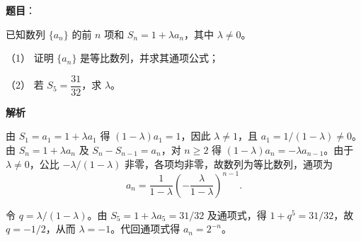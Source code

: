 \begin{answer}

\textbf{题目}：

已知数列 \(\{a_n\}\) 的前 \(n\) 项和 \(S_n=1+\lambda a_n\)，其中 \(\lambda\ne0\)。

（1） 证明 \(\{a_n\}\) 是等比数列，并求其通项公式；

（2） 若 \(S_5=\dfrac{31}{32}\)，求 \(\lambda\)。

\textbf{解析}


由 \(S_1=a_1=1+\lambda a_1\) 得 \((1-\lambda)a_1=1\)，因此 \(\lambda\ne1\)，且 \(a_1=1/(1-\lambda)\ne0\)。由 \(S_n=1+\lambda a_n\) 及 \(S_n-S_{n-1}=a_n\)，对 \(n\geq2\) 得 \((1-\lambda)a_n=-\lambda a_{n-1}\)。由于 \(\lambda\ne0\)，公比 \(-\lambda/(1-\lambda)\) 非零，各项均非零，故数列为等比数列，通项为
\nopagebreak[4]
\[
a_n=\frac1{1-\lambda}\left(-\frac{\lambda}{1-\lambda}\right)^{n-1}.
\]


令 \(q=\lambda/(1-\lambda)\)。由 \(S_5=1+\lambda a_5=31/32\) 及通项式，得 \(1+q^5=31/32\)，故 \(q=-1/2\)，从而 \(\lambda=-1\)。代回通项式得 \(a_n=2^{-n}\)。



\end{answer}
